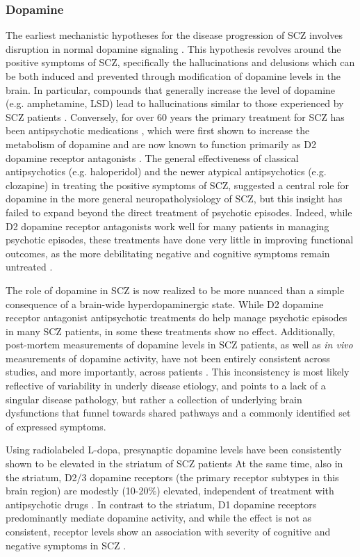 \subsubsection{Dopamine}
The earliest mechanistic hypotheses for the disease progression of SCZ involves disruption in normal dopamine signaling \citep{Matthysse1973}.
This hypothesis revolves around the positive symptoms of SCZ, specifically the hallucinations and delusions which can be both induced and prevented through modification of dopamine levels in the brain.
In particular, compounds that generally increase the level of dopamine (e.g. amphetamine, LSD) lead to hallucinations similar to those experienced by SCZ patients \citep{Angrist1994}\citep{Lieberman1987}.
Conversely, for over 60 years the primary treatment for SCZ has been antipsychotic medications \citep{Delay1952}, which were first shown to increase the metabolism of dopamine \citep{Carlsson1963} and are now known to function primarily as D2 dopamine receptor antagonists \citep{}.
The general effectiveness of classical antipsychotics (e.g. haloperidol) and the newer atypical antipsychotics (e.g. clozapine) in treating the positive symptoms of SCZ, suggested a central role for dopamine in the more general neuropatholysiology of SCZ, but this insight has failed to expand beyond the direct treatment of psychotic episodes.
Indeed, while D2 dopamine receptor antagonists work well for many patients in managing psychotic episodes, these treatments have done very little in improving functional outcomes, as the more debilitating negative and cognitive symptoms remain untreated \citep{Insel2010}.

The role of dopamine in SCZ is now realized to be more nuanced than a simple consequence of a brain-wide hyperdopaminergic state.
While D2 dopamine receptor antagonist antipsychotic treatments do help manage psychotic episodes in many SCZ patients, in some these treatments show no effect.
Additionally, post-mortem measurements of dopamine levels in SCZ patients, as well as \emph{in vivo} measurements of dopamine activity, have not been entirely consistent across studies, and more importantly, across patients \citep{}.
This inconsistency is most likely reflective of variability in underly disease etiology, and points to a lack of a singular disease pathology, but rather a collection of underlying brain dysfunctions that funnel towards shared pathways and a commonly identified set of expressed symptoms.

Using radiolabeled L-dopa, presynaptic dopamine levels have been consistently shown to be elevated in the striatum of SCZ patients \citep[for review, see][]{Howes2007}
At the same time, also in the striatum, D2/3 dopamine receptors (the primary receptor subtypes in this brain region) are modestly (10-20$\%$) elevated, independent of treatment with antipsychotic drugs \citep[for review, see][]{Howes2009}.
In contrast to the striatum, D1 dopamine receptors predominantly mediate dopamine activity, and while the effect is not as consistent, receptor levels show an association with severity of cognitive and negative symptoms in SCZ \citep{Goldman-Rakic2004}.



